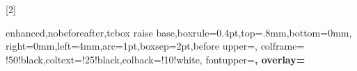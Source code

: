 \newcommand{\xpComp}[2]{
\cpbox{#1}{#2} {\textbf{#1}}}



\newtcbox{\cpbox}[2]{enhanced,nobeforeafter,tcbox raise base,boxrule=0.4pt,top=.8mm,bottom=0mm,
  right=0mm,left=4mm,arc=1pt,boxsep=2pt,before upper={\vphantom{dlg}},
  colframe= !50!black,coltext=!25!black,colback=!10!white,
  fontupper=\sffamily\bfseries,
  overlay={}}


\newcommand{\progress}[1]{
    \begin{tikzpicture}
        \fill[bleuxpc, rounded corners =1 mm] (0,0) rectangle (#1/100*2.5,.4);
         \draw[bleuxp,thick, rounded corners =1 mm] (0,0) rectangle (2.5,.4);
         \node at (1.25,0.2) {\textcolor{black}{#1~\%}};
    \end{tikzpicture}
}

\newcommand{\CommaXp}{, }

